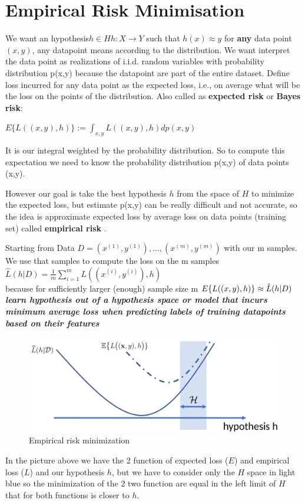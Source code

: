 \chapter{Empirical Risk Minimisation}
We want an hypothesis$h \in H  h:X\rightarrow Y $ such that $h(x) \approx y$ for \textbf{any} data point $ (x,y)$, any datapoint means according to the distribution.
We want interpret the data point as realizations of i.i.d. random variables with probability distribution p(x,y) because the datapoint are part of the entire dataset. Define loss incurred for any data point as the expected loss, i.e., on average what will be the loss on the points of the distribution. Also called as \textbf{expected risk} or \textbf{Bayes risk}:
\begin{center}
    $E\{L((x,y),h)\} := \int_{x,y} L((x,y),h) d p (x,y) $
\end{center}
It is our integral weighted by the probability distribution. So to compute this expectation we need to know the probability distribution p(x,y) of data points (x,y).

However our goal is take the best hypothesis $h$ from the space of $H$ to minimize the expected loss, but estimate p(x,y) can be really difficult and not accurate, so the idea is approximate expected loss by average loss on data points (training set) called \textbf{empirical risk }.
\begin{center}
   Starting from Data $D = {(x^{(1)} , y^{(1)}), \dots , (x^{(m)} , y^{(m)})}$ with our m samples.\\
   We use that samples to compute the loss on the m samples $ \hat{L}(h|D) = \frac{1}{m} \sum\limits_{i=1}^m L((x^{(i)}, y^{(i)} ),h)$\\
   because for sufficiently larger (enough) sample size m $E\{L((x,y),h)\} \approx \Hat{L}(h|D) $\\
  \textbf{ \textit{learn hypothesis out of a hypothesis space or model that incurs minimum average loss when predicting labels of training datapoints based on their features}}
\end{center}
\begin{figure}[H]
    \centering
    \includegraphics[scale=0.3]{images/ERM/ERM1.png}
    \caption{Empirical risk minimization}
    \label{fig:enter-label}
\end{figure}
In the picture above we have the 2 function of expected loss ($E$) and empirical loss ($L$) and our hypothesis $h$, but we have to consider only the $H$ space in light blue so the minimization of the 2 two function are equal in the left limit of $H$ that for both functions is closer to $h$.

